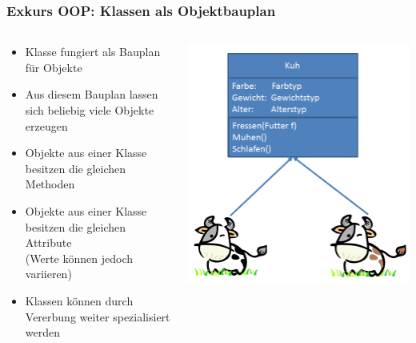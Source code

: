 \begin{frame}
\frametitle{Exkurs OOP: Klassen als Objektbauplan}
	\begin{columns}
	    \begin{column}{.6\textwidth}
			\small
			\begin{itemize}
			  \item Klasse fungiert als Bauplan f\"ur Objekte
			  \item Aus diesem Bauplan lassen sich beliebig viele Objekte erzeugen
			  \item Objekte aus einer Klasse besitzen die gleichen Methoden
			  \item Objekte aus einer Klasse besitzen die gleichen Attribute \\(Werte
			  k\"onnen jedoch variieren)
			  \item Klassen k\"onnen durch Vererbung weiter spezialisiert werden
			\end{itemize}
			\normalsize
	    \end{column}
	    \begin{column}{.4\textwidth}
	   		\center
			\includegraphics[width=\textwidth,
			keepaspectratio=true]{bilder/kuh_klasse.png}
	    \end{column}
	\end{columns}
\end{frame}

